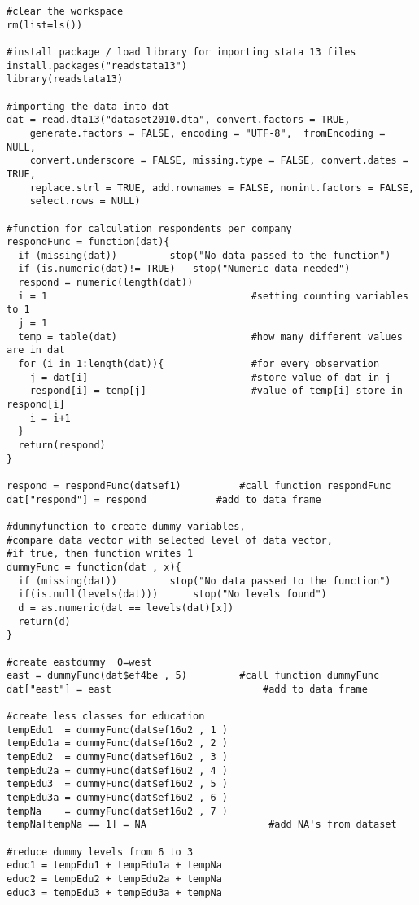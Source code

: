 \begin{lstlisting}
#clear the workspace
rm(list=ls())

#install package / load library for importing stata 13 files
install.packages("readstata13")
library(readstata13)

#importing the data into dat
dat = read.dta13("dataset2010.dta", convert.factors = TRUE, 
	generate.factors = FALSE, encoding = "UTF-8",  fromEncoding = NULL,  
	convert.underscore = FALSE, missing.type = FALSE, convert.dates = TRUE, 
	replace.strl = TRUE, add.rownames = FALSE, nonint.factors = FALSE,
	select.rows = NULL)

#function for calculation respondents per company
respondFunc = function(dat){
  if (missing(dat)) 		stop("No data passed to the function")
  if (is.numeric(dat)!= TRUE)	stop("Numeric data needed")
  respond = numeric(length(dat))
  i = 1                                   #setting counting variables to 1
  j = 1
  temp = table(dat)                       #how many different values are in dat
  for (i in 1:length(dat)){               #for every observation
    j = dat[i]                            #store value of dat in j
    respond[i] = temp[j]                  #value of temp[i] store in respond[i]
    i = i+1              
  }
  return(respond)
}

respond = respondFunc(dat$ef1)			#call function respondFunc
dat["respond"] = respond			#add to data frame

#dummyfunction to create dummy variables,
#compare data vector with selected level of data vector, 
#if true, then function writes 1
dummyFunc = function(dat , x){
  if (missing(dat))			stop("No data passed to the function")
  if(is.null(levels(dat)))		stop("No levels found")
  d = as.numeric(dat == levels(dat)[x])      
  return(d)
}

#create eastdummy  0=west
east = dummyFunc(dat$ef4be , 5)  		#call function dummyFunc
dat["east"] = east           	    		#add to data frame

#create less classes for education
tempEdu1  = dummyFunc(dat$ef16u2 , 1 )
tempEdu1a = dummyFunc(dat$ef16u2 , 2 )
tempEdu2  = dummyFunc(dat$ef16u2 , 3 )
tempEdu2a = dummyFunc(dat$ef16u2 , 4 )
tempEdu3  = dummyFunc(dat$ef16u2 , 5 )
tempEdu3a = dummyFunc(dat$ef16u2 , 6 )
tempNa    = dummyFunc(dat$ef16u2 , 7 )
tempNa[tempNa == 1] = NA               		 #add NA's from dataset

#reduce dummy levels from 6 to 3
educ1 = tempEdu1 + tempEdu1a + tempNa   
educ2 = tempEdu2 + tempEdu2a + tempNa
educ3 = tempEdu3 + tempEdu3a + tempNa


\end{lstlisting}
